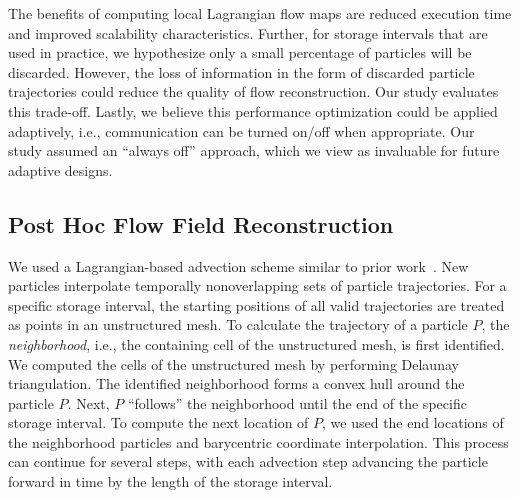 The benefits of computing local Lagrangian flow maps are reduced execution time and improved scalability characteristics. 
%
Further, for storage intervals that are used in practice, we hypothesize only a small percentage of particles will be discarded.
%
However, the loss of information in the form of discarded particle trajectories could reduce the quality of flow reconstruction.
%
Our study evaluates this trade-off.
%
Lastly, we believe this performance optimization could be applied adaptively, i.e., communication can be turned on/off when appropriate.
%
Our study assumed an ``always off'' approach, which we view as invaluable for future adaptive designs.

\vspace{-2mm}
\subsection{Post Hoc Flow Field Reconstruction}
\label{sec:posthoc}
We used a Lagrangian-based advection scheme similar to prior work~\cite{agranovsky2014improved, bujack2015lagrangian}.
%
New particles interpolate temporally nonoverlapping sets of particle trajectories.
%
For a specific storage interval, the starting positions of all valid trajectories are treated as points in an unstructured mesh.
%
To calculate the trajectory of a particle $P$, the \textit{neighborhood}, i.e., the containing cell of the unstructured mesh, is first identified.
%
We computed the cells of the unstructured mesh by performing Delaunay triangulation.
%
The identified neighborhood forms a convex hull around the particle $P$.
%
Next, $P$ ``follows'' the neighborhood until the end of the specific storage interval.
%
To compute the next location of $P$, we used the end locations of the neighborhood particles and barycentric coordinate interpolation.
%
This process can continue for several steps, with each advection step advancing the particle forward in time by the length of the storage interval.
%
